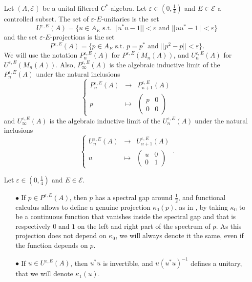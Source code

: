 \begin{definition}
Let $(A,\mathcal E)$ be a unital filtered $C^*$-algebra. Let $\varepsilon\in(0,\frac{1}{4})$ and $E\in \mathcal E$ a controlled subset. The set of $\varepsilon$-$E$-unitaries is the set 
\[U^{\varepsilon, E}(A)= \{u\in A_E \text{ s.t. } ||u^*u-1||<\varepsilon\text{ and }||uu^*-1||<\varepsilon \}\]
and the set $\varepsilon$-$E$-projections is the set 
\[P^{\varepsilon, E}(A)= \{p\in A_E \text{ s.t. } p=p^*\text{ and }||p^2-p||<\varepsilon \}.\]
We will use the notation $P_n^{\varepsilon, E}(A)$ for $P^{\varepsilon, E}(M_n(A))$, and $U_n^{\varepsilon, E}(A)$ for $U^{\varepsilon, E}(M_n(A))$. Also, $P_\infty^{\varepsilon, E}(A)$ is the algebraic inductive limit of the $P_n^{\varepsilon, E}(A)$ under the natural inclusions
\[\left\{\begin{array}{rcl}
	P^{\varepsilon,E}_n(A) 		& \rightarrow	& P^{\varepsilon,E}_{n+1}(A)\\ 
	p 		& \mapsto 	& \begin{pmatrix}p& 0 \\ 0&0 \end{pmatrix}
\end{array}\right.\]
and $U_\infty^{\varepsilon, E}(A)$ is the algebraic inductive limit of the $U_n^{\varepsilon, E}(A)$ under the natural inclusions
\[\left\{\begin{array}{rcl}
	U^{\varepsilon,E}_n(A) 		& \rightarrow	& U^{\varepsilon,E}_{n+1}(A)\\ 
	u 		& \mapsto 	& \begin{pmatrix}u & 0 \\ 0& 1 \end{pmatrix}
\end{array}\right. .\]
\end{definition}

\begin{rk}Let $\varepsilon\in (0,\frac{1}{4})$ and $E\in\mathcal E$.\\
\begin{itemize}
\item[$\bullet$] If $p\in P^{\varepsilon,E}(A)$, then $p$ has a spectral gap around $\frac{1}{2}$, and functional calculus allows to define a genuine projection $\kappa_0(p)$, as in \cite{OY2}, by taking $\kappa_0$ to be a continuous function that vanishes inside the spectral gap and that is respectively $0$ and $1$ on the left and right part of the spectrum of $p$. As this projection does not depend on $\kappa_0$, we will always denote it the same, even if the function depends on $p$.\\
\item[$\bullet$] If $u\in U^{\varepsilon,E}(A)$, then $u^* u$ is invertible, and $u(u^* u)^{-1}$ defines a unitary, that we will denote $\kappa_1(u)$.
\end{itemize}
\end{rk}

